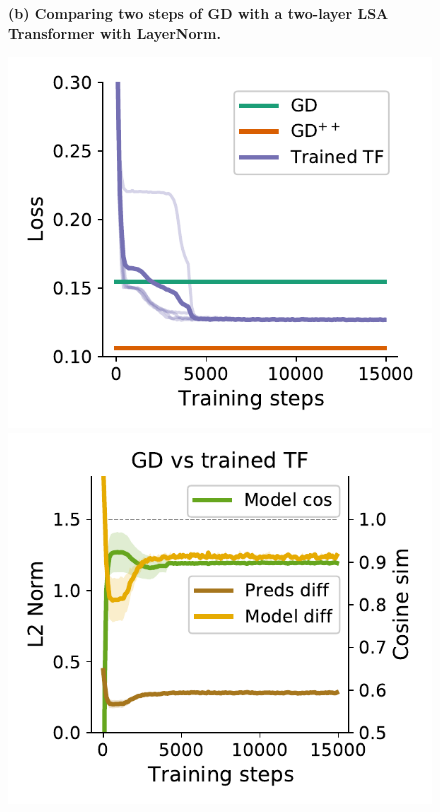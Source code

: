 \documentclass{article}
\theoremstyle{plain}
\theoremstyle{definition}
\theoremstyle{remark}
\begin{document}
\begin{figure}
\begin{center}
\begin{minipage}{.23\textwidth}
\begin{center}
  \end{center}
  \vspace{-10pt}
\end{minipage}
\end{center}
\textbf{(b) Comparing two steps of GD with a two-layer LSA Transformer with LayerNorm.}
\begin{center}
\begin{minipage}{.24\textwidth}
  \centering
  \begin{center}
    \includegraphics[width=1.\textwidth]{Final_figures/LayerNorm/train_24.pdf}
  \end{center}
  \vspace{-10pt}
\end{minipage}
\begin{minipage}{.24\textwidth}
  \centering
  \begin{center}
    \includegraphics[width=1.\textwidth]{Final_figures/LayerNorm/sim_8.pdf}

\end{center}
\end{minipage}
\end{center}
\end{figure}
\end{document}
